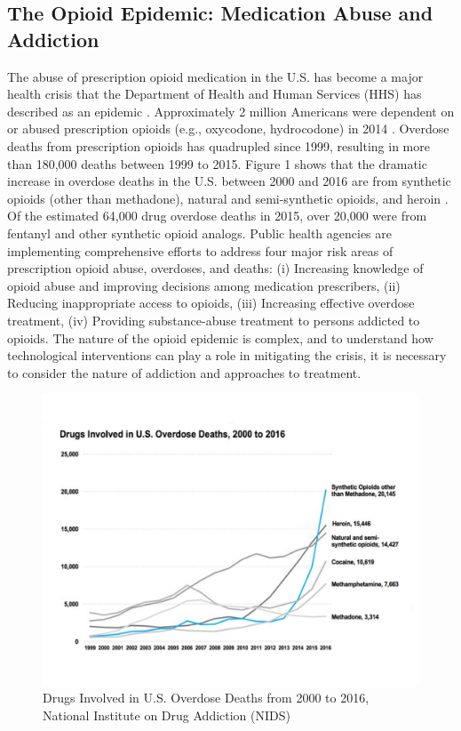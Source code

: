 \documentclass[sigconf]{acmart}
\begin{document}
\subsection{The Opioid Epidemic: Medication Abuse and Addiction} 

The abuse of prescription opioid medication in the U.S. has become a major health 
crisis that the Department of Health and Human Services (HHS) has described as an 
epidemic \cite{volkow14}. Approximately 2 million Americans were dependent on 
or abused prescription opioids (e.g., oxycodone, hydrocodone) in 2014 \cite{cdc17}. 
Overdose deaths from prescription opioids has quadrupled since 1999, resulting in 
more than 180,000 deaths between 1999 to 2015. Figure 1 shows that the dramatic 
increase in overdose deaths in the U.S. between 2000 and 2016 are from synthetic 
opioids (other than methadone), natural and semi-synthetic opioids, and heroin 
\cite{nida17}. Of the estimated 64,000 drug overdose deaths in 2015, over 20,000 
were from fentanyl and other synthetic opioid analogs. Public health agencies 
are implementing comprehensive efforts to address four major risk areas of
prescription opioid abuse, overdoses, and deaths: (i) Increasing knowledge of 
opioid abuse and improving decisions among medication prescribers, (ii) Reducing 
inappropriate access to opioids, (iii) Increasing effective overdose treatment, 
(iv) Providing substance-abuse treatment to persons addicted to opioids. The 
nature of the opioid epidemic is complex, and to understand how technological 
interventions can play a role in mitigating the crisis, it is necessary to 
consider the nature of addiction and approaches to treatment. 

\begin{figure}[!ht]
  \centering\includegraphics[width=\columnwidth]{images/Figure1.pdf}
  \caption{Drugs Involved in U.S. Overdose Deaths from 2000 to 2016, 
  National Institute on Drug Addiction (NIDS) \cite{nida17}
  }\label{f:Figure1}
\end{figure}
\end{document}
